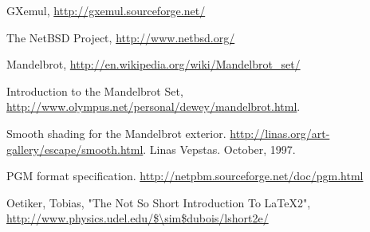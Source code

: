 \documentclass[a4paper,10pt]{article}
\begin{document}
\begin{thebibliography}{99}

 GXemul, \url{http://gxemul.sourceforge.net/}

 The NetBSD Project, \url{http://www.netbsd.org/}

 Mandelbrot, \url{http://en.wikipedia.org/wiki/Mandelbrot\_set/}

 Introduction to the Mandelbrot Set,
\url{http://www.olympus.net/personal/dewey/mandelbrot.html}.

 Smooth shading for the Mandelbrot exterior.
\url{http://linas.org/art-gallery/escape/smooth.html}. Linas Vepstas. October, 1997.

 PGM format specification.
\url{http://netpbm.sourceforge.net/doc/pgm.html}

 Oetiker, Tobias, "The Not So Short Introduction To LaTeX2", \url{http://www.physics.udel.edu/$\sim$dubois/lshort2e/}

\end{thebibliography}
\end{document}
